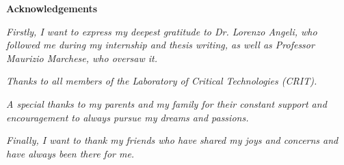 \thispagestyle{empty}


\begin{center}
  {\bf \Huge Acknowledgements}
\end{center}

\vspace{4cm}
\emph{Firstly, I want to express my deepest gratitude to Dr. Lorenzo Angeli, who
followed me during my internship and thesis writing, as well as Professor Maurizio
Marchese, who oversaw it.}

\vspace{0.5cm}
\emph{Thanks to all members of the Laboratory of Critical Technologies (CRIT).}

\vspace{0.5cm}
\emph{A special thanks to my parents and my family for their constant support
and encouragement to always pursue my dreams and passions.}

\vspace{0.5cm}
\emph{Finally, I want to thank my friends who have shared my joys and concerns
and have always been there for me.}